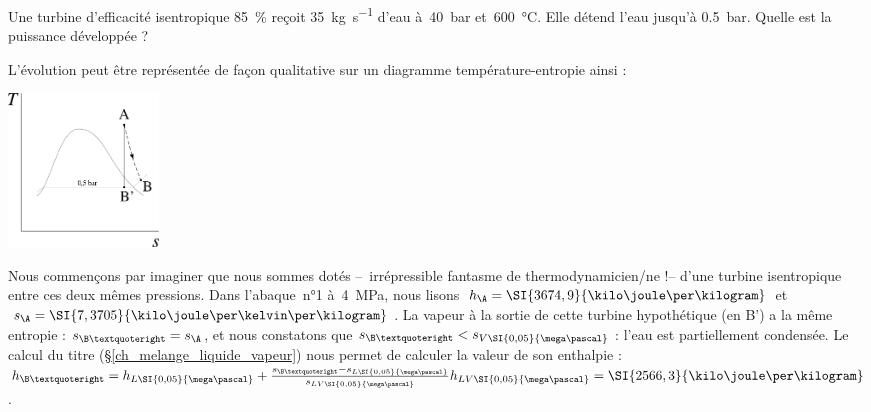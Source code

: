 		\begin{anexample}
		\label{exemple_turbine_centrale}
			Une turbine d’efficacité isentropique \SI{85}{\percent} reçoit \SI{35}{\kilogram\per\second} d’eau à~\SI{40}{\bar} et~\SI{600}{\degreeCelsius}. Elle détend l’eau jusqu’à \SI{0,5}{\bar}. Quelle est la puissance développée ?
				\begin{answer}
					L’évolution peut être représentée de façon qualitative sur un diagramme température-entropie ainsi :
						\begin{center}\includegraphics[width=4cm]{images/exe_ts_turbine.png}\end{center}
					Nous commençons par imaginer que nous sommes dotés --\ irrépressible fantasme de thermodynamicien/ne !-- d’une turbine isentropique entre ces deux mêmes pressions. Dans l’abaque~n°1 à~\SI{4}{\mega\pascal}, nous lisons $h_\A = \SI{3674,9}{\kilo\joule\per\kilogram}$ et $s_\A = \SI{7,3705}{\kilo\joule\per\kelvin\per\kilogram}$. La vapeur à la sortie de cette turbine hypothétique (en B’) a la même entropie : $s_{\B’} = s_\A$, et nous constatons que $s_{\B’} < s_{V \SI{0,05}{\mega\pascal}}$ : l’eau est partiellement condensée. Le calcul du titre (\S\ref{ch_melange_liquide_vapeur}) nous permet de calculer la valeur de son enthalpie : $h_{\B’} = h_{L \SI{0,05}{\mega\pascal}} + \frac{s_{\B’} - s_{L \SI{0,05}{\mega\pascal}}}{s_{LV \SI{0,05}{\mega\pascal}}} h_{LV \SI{0,05}{\mega\pascal}} = \SI{2566,3}{\kilo\joule\per\kilogram}$.
					

\end{answer}
\end{anexample}
